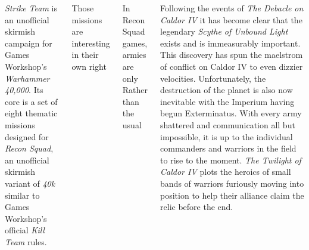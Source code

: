 \clearpage
{}

\begin{columns}

  \emph{Strike Team} is an unofficial skirmish campaign for Games
  Workshop's \emph{Warhammer 40,000}.  Its core is a set of eight
  thematic missions designed for \emph{Recon Squad}, an unofficial
  skirmish variant of \emph{40k} similar to Games Workshop's official
  \emph{Kill Team} rules.

  Those missions are interesting in their own right


In Recon Squad games, armies are only 
Rather than
the usual 



  Following the events of \emph{The Debacle on Caldor IV} it has
  become clear that the legendary \emph{Scythe of Unbound Light}
  exists and is immeasurably important.  This discovery has spun the
  maelstrom of conflict on Caldor IV to even dizzier velocities.
  Unfortunately, the destruction of the planet is also now inevitable
  with the Imperium having begun Exterminatus.  With every army
  shattered and communication all but impossible, it is up to the
  individual commanders and warriors in the field to rise to the
  moment.  \emph{The Twilight of Caldor IV} plots the heroics of small
  bands of warriors furiously moving into position to help their
  alliance claim the relic before the end.

\columnbreak
\noindent{}


\end{columns}
